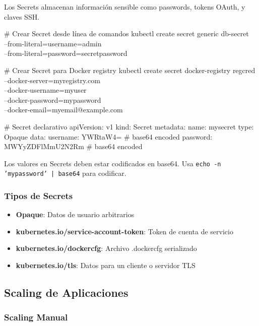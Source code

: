 \documentclass[11pt,a4paper]{article}
\begin{document}
Los Secrets almacenan información sensible como passwords, tokens OAuth, y claves SSH.

\begin{commandbox}
\# Crear Secret desde línea de comandos
kubectl create secret generic db-secret \\
  --from-literal=username=admin \\
  --from-literal=password=secretpassword

\# Crear Secret para Docker registry
kubectl create secret docker-registry regcred \\
  --docker-server=myregistry.com \\
  --docker-username=myuser \\
  --docker-password=mypassword \\
  --docker-email=myemail@example.com

\# Secret declarativo
apiVersion: v1
kind: Secret
metadata:
  name: mysecret
type: Opaque
data:
  username: YWRtaW4=  # base64 encoded
  password: MWYyZDFlMmU2N2Rm  # base64 encoded
\end{commandbox}

\begin{tipbox}
Los valores en Secrets deben estar codificados en base64. Usa \texttt{echo -n 'mypassword' | base64} para codificar.
\end{tipbox}

\subsubsection{Tipos de Secrets}

\begin{itemize}
    \item \textbf{Opaque}: Datos de usuario arbitrarios
    \item \textbf{kubernetes.io/service-account-token}: Token de cuenta de servicio
    \item \textbf{kubernetes.io/dockercfg}: Archivo .dockercfg serializado
    \item \textbf{kubernetes.io/tls}: Datos para un cliente o servidor TLS
\end{itemize}

\subsection{Scaling de Aplicaciones}

\subsubsection{Scaling Manual}
\end{document}
